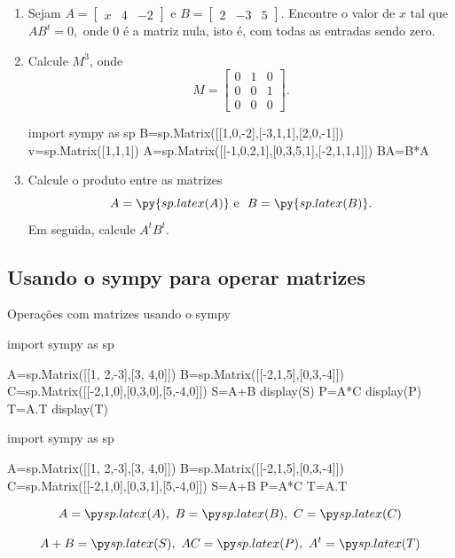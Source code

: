\begin{frame}[label=matrizes,fragile]
\begin{casa}
\begin{enumerate}
\item Sejam    $A=\begin{bmatrix} x & 4 &  -2 \end{bmatrix}$  e  $B=\begin{bmatrix} 2 & -3 & 5 \end{bmatrix}$. Encontre o valor de $x$ tal que $AB^t=0,$ onde $0$ é a matriz nula, isto é, com todas as entradas sendo zero.

\item Calcule $M^3$, onde 
\[M=\begin{bmatrix}
0 & 1 & 0\\
0 & 0 & 1\\
0 & 0 & 0
\end{bmatrix}.
\]
\begin{pycode}
import sympy as sp
B=sp.Matrix([[1,0,-2],[-3,1,1],[2,0,-1]])
v=sp.Matrix([1,1,1])
A=sp.Matrix([[-1,0,2,1],[0,3,5,1],[-2,1,1,1]])
BA=B*A
\end{pycode}
\item  Calcule o produto entre as matrizes
\[
A=\py{sp.latex(A)} \text{ e } \ B=\py{sp.latex(B)}.
\]
Em seguida, calcule \(A^tB^t\).

\end{enumerate}
\end{casa}
\end{frame}

\subsection*{Usando o sympy para operar matrizes}



\begin{frame}[label=matrizes,fragile=singleslide]{Operações com matrizes usando o sympy}
	\begin{footnotesize}
\begin{pyverbatim}
import sympy as sp

A=sp.Matrix([[1, 2,-3],[3, 4,0]])
B=sp.Matrix([[-2,1,5],[0,3,-4]])
C=sp.Matrix([[-2,1,0],[0,3,0],[5,-4,0]])
S=A+B
display(S)
P=A*C
display(P)
T=A.T
display(T)

\end{pyverbatim}
	\end{footnotesize}		
\begin{pycode}
import sympy as sp

A=sp.Matrix([[1, 2,-3],[3, 4,0]])
B=sp.Matrix([[-2,1,5],[0,3,-4]])
C=sp.Matrix([[-2,1,0],[0,3,1],[5,-4,0]])
S=A+B
P=A*C
T=A.T
\end{pycode}
\[A=\pyl{A},\ B=\pyl{B},\ C=\pyl{C}\]

\[A+B=\pyl{S},\ AC=\pyl{P},\ A^t=\pyl{T}\]

\end{frame}





